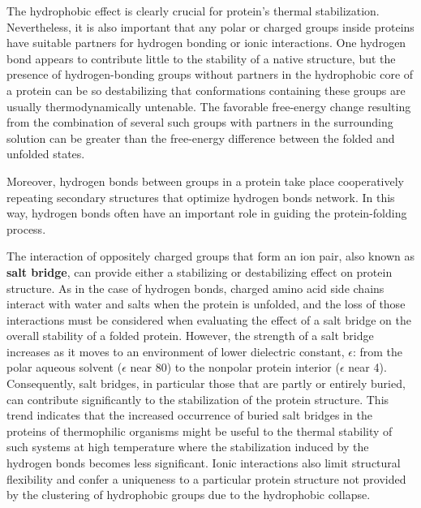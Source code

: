 The hydrophobic effect is clearly crucial for protein's thermal stabilization. Nevertheless, it is also important that any polar or charged groups inside proteins have suitable partners for hydrogen bonding or ionic interactions. One hydrogen bond appears to contribute little to the stability of a native structure, but the presence of hydrogen-bonding groups without partners in the hydrophobic core of a protein can be so destabilizing that conformations containing these groups are usually thermodynamically untenable. The favorable free-energy change resulting from the combination of several such groups with partners in the surrounding solution can be greater than the free-energy difference between the folded and unfolded states. 

Moreover, hydrogen bonds between groups in a protein take place cooperatively repeating secondary structures that optimize hydrogen bonds network. In this way, hydrogen bonds often have an important role in guiding the protein-folding process. 

The interaction of oppositely charged groups that form an ion pair, also known as \textbf{salt bridge}, can provide either a stabilizing or destabilizing effect on protein structure. As in the case of hydrogen bonds, charged amino acid side chains interact with water and salts when the protein is unfolded, and the loss of those interactions must be considered when evaluating the effect of a salt bridge on the overall stability of a folded protein. However, the strength of a salt bridge increases as it moves to an environment of lower dielectric constant, $\epsilon$: from the polar aqueous solvent ($\epsilon$ near 80) to the nonpolar protein interior ($\epsilon$ near 4). Consequently, salt bridges, in particular those that are partly or entirely buried, can contribute significantly to the stabilization of the protein structure. This trend indicates that the increased occurrence of buried salt bridges in the proteins of thermophilic organisms might be useful to the thermal stability of such systems at high temperature where the stabilization induced by the hydrogen bonds becomes less significant. Ionic interactions also limit structural flexibility and confer a uniqueness to a particular protein structure not provided by the clustering of hydrophobic groups due to the hydrophobic collapse. 

